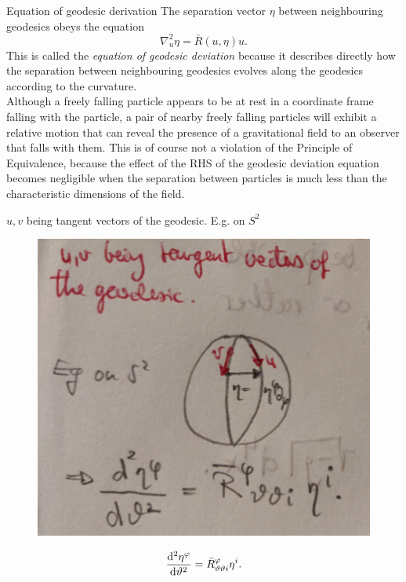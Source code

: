 \begin{mybox}{Equation of geodesic derivation}
	The separation vector $\eta$ between neighbouring geodesics obeys the equation 
	\begin{equation}
		\nabla^2_u \eta = \bar{R}(u,\eta)u.
	\end{equation}
	This is called the \emph{equation of geodesic deviation} because it describes directly how the separation between neighbouring geodesics evolves along the geodesics according to the curvature.\\
	Although a freely falling particle appears to be at rest in a coordinate frame falling with the particle, a pair of nearby freely falling particles will exhibit a relative motion that can reveal the presence of a gravitational field to an observer that falls with them. This is of course not a violation of the Principle of Equivalence, because the effect of the RHS of the geodesic deviation equation becomes negligible when the separation between particles is much less than the characteristic dimensions of the field.
\end{mybox}
$u,v$ being tangent vectors of the geodesic. E.g. on $S^2$ 
\begin{figure}
	\centering 
	\includegraphics[width=0.7 \textwidth]{gfx/Geodesicdeviation.png}
\end{figure}
\begin{equation}
	\frac{\mathrm{d} ^2 \eta^{\varphi}}{\mathrm{d} \vartheta^2} = \bar{R}^{\varphi}_{\vartheta \vartheta i} \eta^i.
\end{equation}




